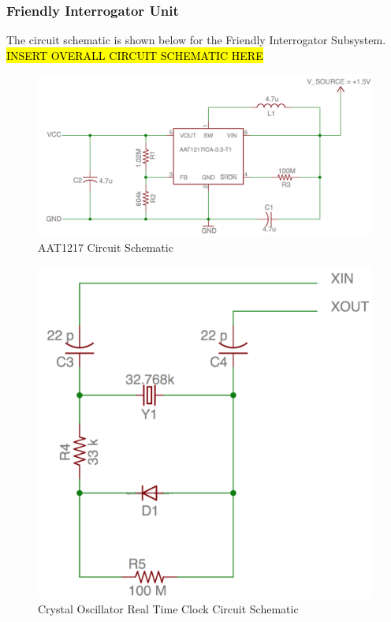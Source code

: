 \documentclass[letterpaper,10pt]{article}
\begin{document}
\begin{spacing}{1.15}
\subsubsection{Friendly Interrogator Unit}
The circuit schematic is shown below for the Friendly Interrogator Subsystem.
\hl{INSERT OVERALL CIRCUIT SCHEMATIC HERE}
\begin{figure} [H]
	\centering
	\includegraphics[scale=0.35]{Voltage_Converter_Schematic.png}
	\caption{AAT1217 Circuit Schematic\label{fig:voltage-converter-schematic}}
\end{figure}

\begin{figure} [H]
	\centering
	\includegraphics[scale=0.35]{Crystal_Oscillator_Schematic.png}
	\caption{Crystal Oscillator Real Time Clock Circuit Schematic\label{fig:crystal-oscillator-schematic}}
\end{figure}


\end{spacing}
\end{document}
